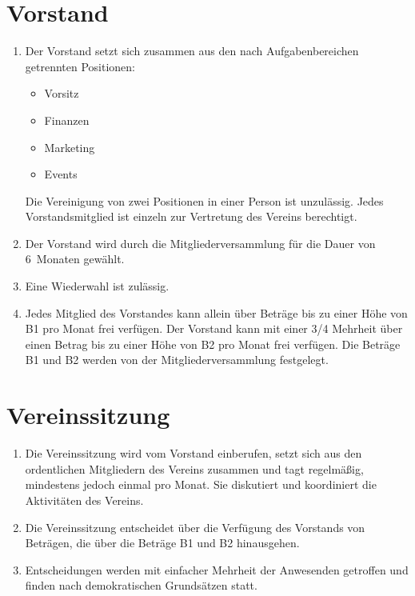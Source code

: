 \documentclass[a4paper]{scrartcl}
\begin{document}
\section{Vorstand}
\begin{enumerate}
    \item Der Vorstand setzt sich zusammen aus den nach Aufgabenbereichen
          getrennten Positionen:
          \begin{itemize}
              \item Vorsitz
              \item Finanzen
              \item Marketing
              \item Events
          \end{itemize}
          Die Vereinigung von zwei Positionen in einer Person ist unzulässig.
          Jedes Vorstandsmitglied ist einzeln zur Vertretung des Vereins
          berechtigt.
    \item Der Vorstand wird durch die Mitgliederversammlung für die Dauer von
          6~Monaten gewählt.
    \item Eine Wiederwahl ist zulässig.
    \item Jedes Mitglied des Vorstandes kann allein über Beträge bis zu einer
          Höhe von B1 pro Monat frei verfügen. Der Vorstand kann mit einer 3/4
          Mehrheit über einen Betrag bis zu einer Höhe von B2 pro Monat frei
          verfügen. Die Beträge B1 und B2 werden von der Mitgliederversammlung
          festgelegt.
\end{enumerate}


\section{Vereinssitzung}
\begin{enumerate}
    \item Die Vereinssitzung wird vom Vorstand einberufen, setzt sich aus den
          ordentlichen Mitgliedern des Vereins zusammen und tagt regelmäßig,
          mindestens jedoch einmal pro Monat. Sie diskutiert und koordiniert
          die Aktivitäten des Vereins.
    \item Die Vereinssitzung entscheidet über die Verfügung des Vorstands von
          Beträgen, die über die Beträge B1 und B2 hinausgehen.
    \item Entscheidungen werden mit einfacher Mehrheit der Anwesenden getroffen
          und finden nach demokratischen Grundsätzen statt.
\end{enumerate}
\end{document}
